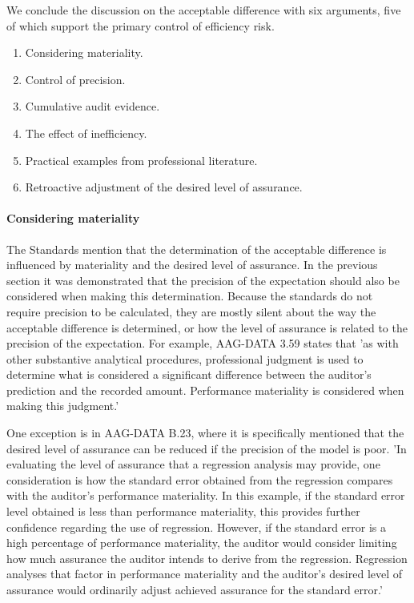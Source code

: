 \documentclass[12pt,a4paper]{memoir}
\begin{document}
\bigskip
We conclude the discussion on the acceptable difference with six arguments, five of which support the primary control of efficiency risk.

\begin{enumerate}
	\item Considering materiality.
	\item Control of precision.
	\item Cumulative audit evidence.
	\item The effect of inefficiency.
	\item Practical examples from professional literature.
	\item Retroactive adjustment of the desired level of assurance.
\end{enumerate}

\paragraph{Considering materiality} The Standards mention that the determination of the acceptable difference is influenced by materiality and the desired level of assurance. In the previous section it was demonstrated that the precision of the expectation should also be considered when making this determination. Because the standards do not require precision to be calculated, they are mostly silent about the way the acceptable difference is determined, or how the level of assurance is related to the precision of the expectation. For example, AAG-DATA 3.59 states that 'as with other substantive analytical procedures, professional judgment is used to determine what is considered a significant difference between the auditor's prediction and the recorded amount. Performance materiality is considered when making this judgment.' 

One exception is in AAG-DATA B.23, where it is specifically mentioned that the desired level of assurance can be reduced if the precision of the model is poor. 'In evaluating the level of assurance that a regression analysis may provide, one consideration is how the standard error obtained from the regression compares with the auditor's performance materiality. In this example, if the standard error level obtained is less than performance materiality, this provides further confidence regarding the use of regression. However, if the standard error is a high percentage of performance materiality, the auditor would consider limiting how much assurance the auditor intends to derive from the regression. Regression analyses that factor in performance materiality and the auditor's desired level of assurance would ordinarily adjust achieved assurance for the standard error.'
\end{document}
